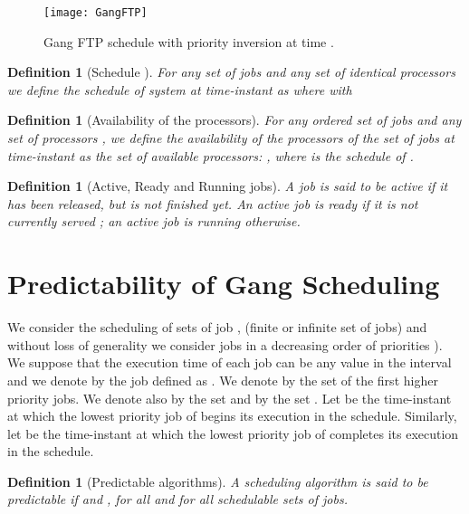 \documentclass[a4paper]{article}
\newtheorem{definition}[theorem]{Definition}
\begin{document}
\begin{figure}
\begin{center}
\texttt{[image: GangFTP]}
\caption{\label{fig:gangftp}Gang FTP schedule with priority inversion at time .} 
\end{center}\end{figure}

\begin{definition}[Schedule ]\label{def:sched}
  For any set of jobs  and any set of  identical processors  we define the \emph{schedule}  of system  at time-instant  as
   where  with \\
  
\end{definition}
\begin{definition}[Availability of the processors]\label{def:avaiJob}
For any ordered set of jobs  and any set of  processors , we define the {\em availability of the processors}  of the set of jobs  at time-instant  as the set of available processors: , where  is the schedule of .
\end{definition}

\begin{definition}[Active, Ready and Running jobs]
A job is said to be \emph{active} if it has been released, but is not finished yet. An active job is \emph{ready} if it is not currently served ; an active job is \emph{running} otherwise. 
\end{definition}




\section{Predictability of Gang Scheduling}\label{sec:predict}


We consider the scheduling of sets of job , (finite or infinite set of jobs) and without loss of generality we consider jobs in a decreasing order of priorities ). We suppose that the execution time of each job  can be any value in the interval  and we denote by  the job defined as . We denote by  the set of the first  higher priority jobs. We denote also by  the set  and by  the set . Let  be the time-instant at which the lowest priority job of  begins its execution in the schedule. Similarly, let  be the time-instant at which the lowest priority job of  completes its execution in the schedule.

\begin{definition}[Predictable algorithms]
A scheduling algorithm is said to be {\em predictable} if  and , for all  and for all schedulable  sets of jobs.
\end{definition}
\end{document}
